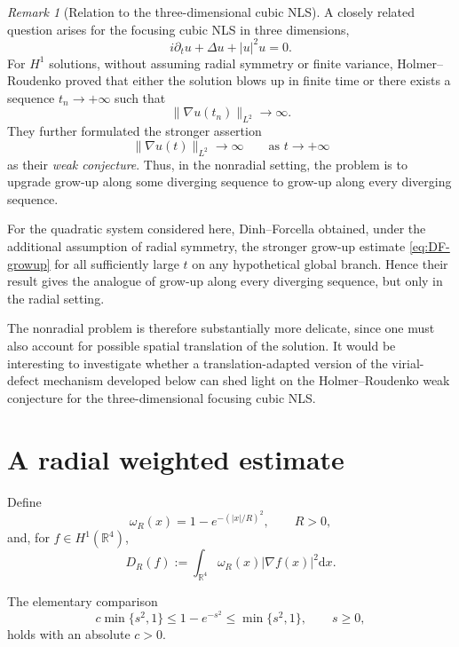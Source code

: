 \documentclass[12pt]{amsart}
\numberwithin{equation}{section}
\theoremstyle{remark}
\newtheorem{remark}[theorem]{Remark}
\newcommand{\R}{\mathbb{R}}
\newcommand{\dd}{\mathrm{d}x}
\begin{document}
\begin{remark}[Relation to the three-dimensional cubic NLS]
A closely related question arises for the focusing cubic NLS in three dimensions,
\[
 i\partial_t u+\Delta u+|u|^2u=0.
\]
For $H^1$ solutions, without assuming radial symmetry or finite variance, Holmer--Roudenko \cite{HR} proved that either the solution blows up in finite time or there exists a sequence $t_n\to+\infty$ such that
\[
 \|\nabla u(t_n)\|_{L^2}\longrightarrow\infty.
\]
They further formulated the stronger assertion
\[
 \|\nabla u(t)\|_{L^2}\longrightarrow\infty \qquad\text{as }t\to+\infty
\]
as their \emph{weak conjecture}. Thus, in the nonradial setting, the problem is to upgrade grow-up along some diverging sequence to grow-up along every diverging sequence.

For the quadratic system considered here, Dinh--Forcella \cite{DF} obtained, under the additional assumption of radial symmetry, the stronger grow-up estimate \eqref{eq:DF-growup} for all sufficiently large $t$ on any hypothetical global branch. Hence their result gives the analogue of grow-up along every diverging sequence, but only in the radial setting.

The nonradial problem is therefore substantially more delicate, since one must also account for possible spatial translation of the solution. It would be interesting to investigate whether a translation-adapted version of the virial-defect mechanism developed below can shed light on the Holmer--Roudenko weak conjecture for the three-dimensional focusing cubic NLS.
\end{remark}



\section{A radial weighted estimate}\label{sec:weighted}
\setcounter{equation}{0}
Define
\begin{equation*}
\omega_R(x)=1-e^{-(|x|/R)^2}, \qquad R>0,
\end{equation*}
and, for $f\in H^1(\R^4)$,
\begin{equation*}
 D_R(f):=\int_{\R^4}\omega_R(x)|\nabla f(x)|^2\dd.
\end{equation*}

The elementary comparison
\begin{equation}\label{eq:omega-basic}
 c\min\{s^2,1\}\le 1-e^{-s^2}\le \min\{s^2,1\},
 \qquad s\ge0,
\end{equation}
holds with an absolute $c>0$.
\end{document}
